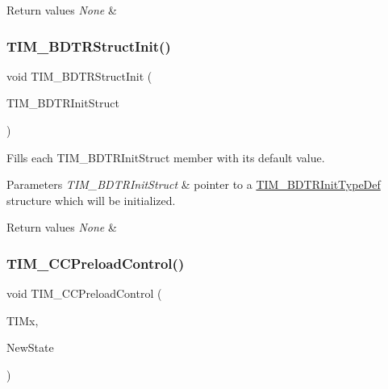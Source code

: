 \begin{DoxyRetVals}{Return values}
{\em None} & \\
\hline
\end{DoxyRetVals}
\mbox{\label{group___t_i_m___exported___functions_gaea0f49938cda8ae0738162194798afc6}} 
\subsubsection{\texorpdfstring{TIM\_BDTRStructInit()}{TIM\_BDTRStructInit()}}
{\footnotesize\ttfamily void T\+I\+M\+\_\+\+B\+D\+T\+R\+Struct\+Init (\begin{DoxyParamCaption}\item[{\mbox{\hyperlink{struct_t_i_m___b_d_t_r_init_type_def}{T\+I\+M\+\_\+\+B\+D\+T\+R\+Init\+Type\+Def}} $\ast$}]{T\+I\+M\+\_\+\+B\+D\+T\+R\+Init\+Struct }\end{DoxyParamCaption})}



Fills each T\+I\+M\+\_\+\+B\+D\+T\+R\+Init\+Struct member with its default value. 


\begin{DoxyParams}{Parameters}
{\em T\+I\+M\+\_\+\+B\+D\+T\+R\+Init\+Struct} & pointer to a \mbox{\hyperlink{struct_t_i_m___b_d_t_r_init_type_def}{T\+I\+M\+\_\+\+B\+D\+T\+R\+Init\+Type\+Def}} structure which will be initialized. \\
\hline
\end{DoxyParams}

\begin{DoxyRetVals}{Return values}
{\em None} & \\
\hline
\end{DoxyRetVals}
\mbox{\label{group___t_i_m___exported___functions_ga0a935254e44312b1d78e8684a58db3c1}} 
\subsubsection{\texorpdfstring{TIM\_CCPreloadControl()}{TIM\_CCPreloadControl()}}
{\footnotesize\ttfamily void T\+I\+M\+\_\+\+C\+C\+Preload\+Control (\begin{DoxyParamCaption}\item[{\mbox{\hyperlink{struct_t_i_m___type_def}{T\+I\+M\+\_\+\+Type\+Def}} $\ast$}]{T\+I\+Mx,  }\item[{\mbox{\hyperlink{group___exported__types_gac9a7e9a35d2513ec15c3b537aaa4fba1}{Functional\+State}}}]{New\+State }\end{DoxyParamCaption})}



